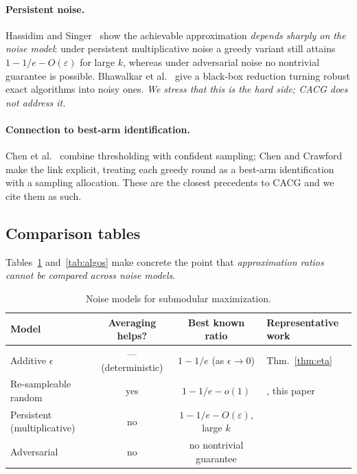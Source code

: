 \documentclass[11pt]{article}
\theoremstyle{plain}
\theoremstyle{definition}
\begin{document}
\paragraph{Persistent noise.}
Hassidim and Singer~\cite{HassidimSinger2017} show the achievable
approximation \emph{depends sharply on the noise model}: under persistent
multiplicative noise a greedy variant still attains $1-1/e-O(\varepsilon)$
for large $k$, whereas under adversarial noise no nontrivial guarantee is
possible. Bhawalkar et al.~\cite{Bhawalkar2025} give a black-box reduction
turning robust exact algorithms into noisy ones. \emph{We stress that this
is the hard side; CACG does not address it.}

\paragraph{Connection to best-arm identification.}
Chen et al.~\cite{ChenXingCrawford2023} combine thresholding with confident
sampling; Chen and Crawford~\cite{ChenCrawford2024} make the link explicit,
treating each greedy round as a best-arm identification with a sampling
allocation. These are the closest precedents to CACG and we cite them as
such.

\subsection{Comparison tables}
Tables~\ref{tab:noise} and~\ref{tab:algos} make concrete the point that
\emph{approximation ratios cannot be compared across noise models}.

\begin{table}[H]
\centering\small
\caption{Noise models for submodular maximization.}\label{tab:noise}
\begin{tabular}{lccl}
\toprule
Model & Averaging helps? & Best known ratio & Representative work\\
\midrule
Additive $\epsilon$        & --- (deterministic) & $1-1/e$ (as $\epsilon\!\to\!0$) & Thm.~\ref{thm:eta}\\
Re-sampleable random       & yes                 & $1-1/e-o(1)$                    & \cite{Singla2016}, this paper\\
Persistent (multiplicative)& no                  & $1-1/e-O(\varepsilon)$, large $k$ & \cite{HassidimSinger2017,Bhawalkar2025}\\
Adversarial                & no                  & no nontrivial guarantee         & \cite{HassidimSinger2017}\\
\bottomrule
\end{tabular}
\end{table}
\end{document}
